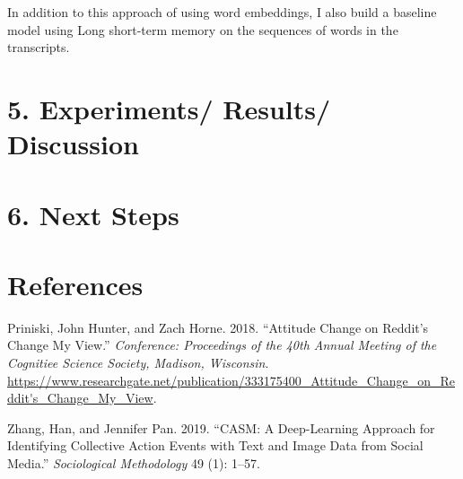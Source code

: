 \documentclass[11pt,]{article}
\begin{document}
In addition to this approach of using word embeddings, I also build a
baseline model using Long short-term memory on the sequences of words in
the transcripts.

\hypertarget{experiments-results-discussion}{%
\section{5. Experiments/ Results/
Discussion}\label{experiments-results-discussion}}

\hypertarget{next-steps}{%
\section{6. Next Steps}\label{next-steps}}

\hypertarget{references}{%
\section*{References}\label{references}}

\hypertarget{refs}{}
\leavevmode\hypertarget{ref-cmv}{}%
Priniski, John Hunter, and Zach Horne. 2018. ``Attitude Change on
Reddit's Change My View.'' \emph{Conference: Proceedings of the 40th
Annual Meeting of the Cognitiee Science Society, Madison, Wisconsin}.
\url{https://www.researchgate.net/publication/333175400_Attitude_Change_on_Reddit's_Change_My_View}.

\leavevmode\hypertarget{ref-zhang}{}%
Zhang, Han, and Jennifer Pan. 2019. ``CASM: A Deep-Learning Approach for
Identifying Collective Action Events with Text and Image Data from
Social Media.'' \emph{Sociological Methodology} 49 (1): 1--57.





\newpage
\singlespacing 
\end{document}
